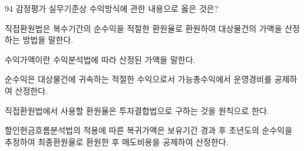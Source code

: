 \begin{question}{94}
감정평가 실무기준상 수익방식에 관한 내용으로 옳은 것은?
\begin{choices}
  \item 직접환원법은 복수기간의 순수익을 적절한 환원율로 환원하여 대상물건의 가액을 산정하는 방법을 말한다.
  \item 수익가액이란 수익분석법에 따라 산정된 가액을 말한다.
  \item 순수익은 대상물건에 귀속하는 적절한 수익으로서 가능총수익에서 운영경비를 공제하여 산정한다.
  \item 직접환원법에서 사용할 환원율은 투자결합법으로 구하는 것을 원칙으로 한다.
  \item 할인현금흐름분석법의 적용에 따른 복귀가액은 보유기간 경과 후 초년도의 순수익을 추정하여 최종환원율로 환원한 후 매도비용을 공제하여 산정한다.
\end{choices}
\end{question}
